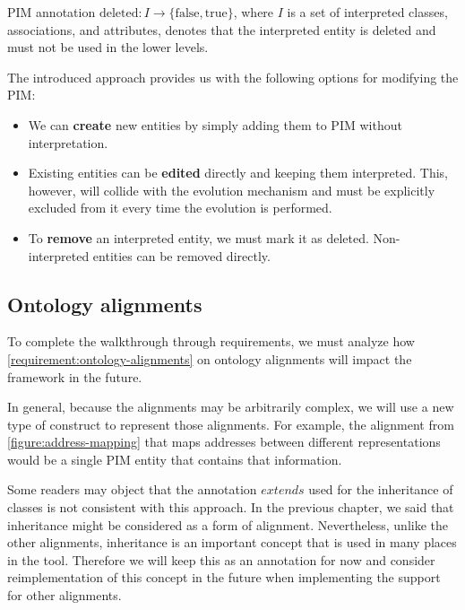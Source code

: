 \begin{definition}[deleted]
    PIM annotation $\textrm{deleted}: I \rightarrow \{\textrm{false}, \textrm{true}\}$, where $I$ is a set of interpreted classes, associations, and attributes, denotes that the interpreted entity is deleted and must not be used in the lower levels.
\end{definition}

\medskip

The introduced approach provides us with the following options for modifying the PIM:
\begin{itemize}
    \item We can \textbf{create} new entities by simply adding them to PIM without interpretation.
    \item Existing entities can be \textbf{edited} directly and keeping them interpreted. This, however, will collide with the evolution mechanism and must be explicitly excluded from it every time the evolution is performed.
    \item To \textbf{remove} an interpreted entity, we must mark it as deleted. Non-in\-ter\-pre\-ted entities can be removed directly.
\end{itemize}

\subsection{Ontology alignments}\label{sec:ontology-alignments}

To complete the walkthrough through requirements, we must analyze how \autoref{requirement:ontology-alignments} on ontology alignments will impact the framework in the future.

In general, because the alignments may be arbitrarily complex, we will use a new type of construct to represent those alignments. For example, the alignment from \autoref{figure:address-mapping} that maps addresses between different representations would be a single PIM entity that contains that information.

Some readers may object that the annotation $extends$ used for the inheritance of classes is not consistent with this approach. In the previous chapter, we said that inheritance might be considered as a form of alignment. Nevertheless, unlike the other alignments, inheritance is an important concept that is used in many places in the tool. Therefore we will keep this as an annotation for now and consider reimplementation of this concept in the future when implementing the support for other alignments.

